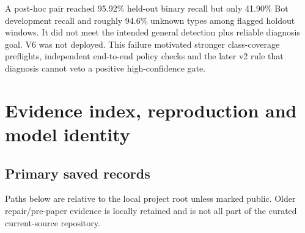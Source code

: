 \documentclass[11pt,a4paper,oneside]{report}
\begin{document}
A post-hoc pair reached 95.92\% held-out binary recall but only 41.90\% Bot development recall and roughly 94.6\% unknown types among flagged holdout windows. It did not meet the intended general detection plus reliable diagnosis goal. V6 was not deployed. This failure motivated stronger class-coverage preflights, independent end-to-end policy checks and the later v2 rule that diagnosis cannot veto a positive high-confidence gate.

\chapter{Evidence index, reproduction and model identity}
\section{Primary saved records}
Paths below are relative to the local project root unless marked public. Older repair/pre-paper evidence is locally retained and is not all part of the curated current-source repository.
\end{document}

